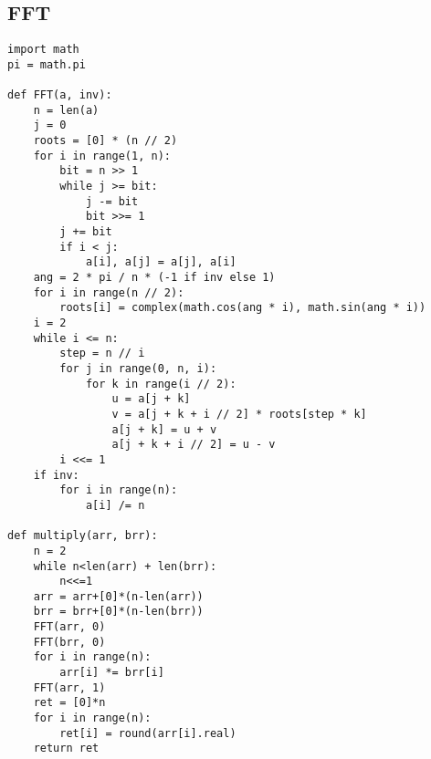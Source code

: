 \documentclass[landscape, 8pt, a4paper, oneside, twocolumn]{extarticle}
\begin{document}
\subsection{FFT}
\begin{verbatim}
import math
pi = math.pi

def FFT(a, inv):
    n = len(a)
    j = 0
    roots = [0] * (n // 2)
    for i in range(1, n):
        bit = n >> 1
        while j >= bit:
            j -= bit
            bit >>= 1
        j += bit
        if i < j:
            a[i], a[j] = a[j], a[i]
    ang = 2 * pi / n * (-1 if inv else 1)
    for i in range(n // 2):
        roots[i] = complex(math.cos(ang * i), math.sin(ang * i))
    i = 2
    while i <= n:
        step = n // i
        for j in range(0, n, i):
            for k in range(i // 2):
                u = a[j + k]
                v = a[j + k + i // 2] * roots[step * k]
                a[j + k] = u + v
                a[j + k + i // 2] = u - v
        i <<= 1
    if inv:
        for i in range(n):
            a[i] /= n

def multiply(arr, brr):
    n = 2
    while n<len(arr) + len(brr):
        n<<=1
    arr = arr+[0]*(n-len(arr))
    brr = brr+[0]*(n-len(brr))
    FFT(arr, 0)
    FFT(brr, 0)
    for i in range(n):
        arr[i] *= brr[i]
    FFT(arr, 1)
    ret = [0]*n
    for i in range(n):
        ret[i] = round(arr[i].real)
    return ret
\end{verbatim}
\end{document}
